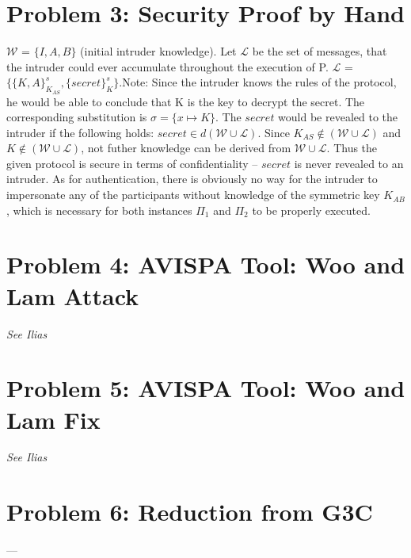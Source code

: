 \documentclass[12pt,pdftex,a4paper]{article}
\begin{document}
\section*{Problem 3: Security Proof by Hand}
$\mathcal{W}$ = $\{I, A, B\}$ (initial intruder knowledge). Let $\mathcal{L}$ be the set of messages, that the intruder could ever accumulate throughout the execution of P. $\mathcal{L}$ = $\{\{K, A\}_{K_{AS}}^s, \{secret\}_K^s\}$.\newline Note: Since the intruder knows the rules of the protocol, he would be able to conclude that K is the key to decrypt the secret. The corresponding substitution is $\sigma = \{x\mapsto K\}$.\newline
The $secret$ would be revealed to the intruder if the following holds: $secret\in d(\mathcal{W}\cup\mathcal{L})$. Since $K_{AS} \notin (\mathcal{W}\cup\mathcal{L})$ and $K \notin (\mathcal{W}\cup\mathcal{L})$, not futher knowledge can be derived from $\mathcal{W}\cup\mathcal{L}$. Thus the given protocol is secure in terms of confidentiality -- $secret$ is never revealed to an intruder. \newline
As for authentication, there is obviously no way for the intruder to impersonate any of the participants without knowledge of the symmetric key $K_{AB}$, which is necessary for both instances $\Pi_1$ and $\Pi_2$ to be properly executed.

\section*{Problem 4: AVISPA Tool: Woo and Lam Attack}
\textit{See Ilias}

\section*{Problem 5: AVISPA Tool: Woo and Lam Fix}
\textit{See Ilias}

\section*{Problem 6: Reduction from G3C}
---
\end{document}
